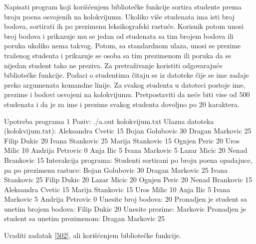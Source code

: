 \begin{Answer}[ref=520]
\end{Answer}
\begin{Exercise}[label=521]
  Napisati program koji korišćenjem bibliotečke funkcije 
  sortira studente prema broju poena osvojenih na kolokvijumu. Ukoliko
  više studenata ima isti broj bodova, sortirati ih po prezimenu
  leksikografski rastuće. Korisnik potom unosi broj bodova i prikazuje
  mu se jedan od studenata sa tim brojem bodova ili poruka ukoliko
  nema takvog. Potom, sa standardnom ulaza, unosi se prezime traženog
  studenta i prikazuje se osoba sa tim prezimenom ili poruka da se
  nijedan student tako ne preziva. Za pretraživanje koristiti
  odgovarajuće bibliotečke funkcije. Podaci o studentima čitaju se iz
  datoteke čije se ime zadaje preko argumenata komandne linije. Za
  svakog studenta u datoteci postoje ime, prezime i bodovi osvojeni na
  kolokvijumu. Pretpostaviti da neće biti vise od $500$ studenata i
  da je za ime i prezime svakog studenta dovoljno po $20$ karaktera.
  
\begin{maxitest}
\begin{test}{Upotreba programa 1}
Poziv:  ./a.out kolokvijum.txt
Ulazna datoteka (kolokvijum.txt):
  Aleksandra Cvetic 15
  Bojan Golubovic 30
  Dragan Markovic 25
  Filip Dukic 20 
  Ivana Stankovic 25
  Marija Stankovic 15 
  Ognjen Peric 20
  Uros Milic 10
  Andrija Petrovic 0
  Anja Ilic 5
  Ivana Markovic 5
  Lazar Micic 20
  Nenad Brankovic 15
Interakcija programa:
  Studenti sortirani po broju poena opadajuce, pa po prezimenu rastuce:
  Bojan Golubovic  30
  Dragan Markovic  25
  Ivana Stankovic  25
  Filip Dukic  20
  Lazar Micic  20
  Ognjen Peric  20
  Nenad Brankovic  15
  Aleksandra Cvetic  15
  Marija Stankovic  15
  Uros Milic  10
  Anja Ilic  5
  Ivana Markovic  5
  Andrija Petrovic  0
  Unesite broj bodova: 20
  Pronadjen je student sa unetim  brojem bodova: Filip Dukic 20
  Unesite prezime: Markovic
  Pronadjen je student sa unetim prezimenom: Dragan Markovic 25
\end{test}
\end{maxitest}
  
\end{Exercise}

\begin{Answer}[ref=521]
\end{Answer}
\begin{Exercise}[label=522]
  Uraditi zadatak \ref{502}, ali korišćenjem bibliotečke 
  funkcije.
  
\end{Exercise}

